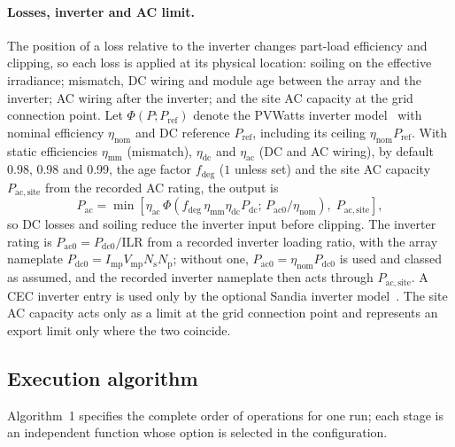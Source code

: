 \documentclass[11pt]{article}
\begin{document}
\paragraph{Losses, inverter and AC limit.}
The position of a loss relative to the inverter changes part-load efficiency and clipping, so each loss is applied at its physical location: soiling on the effective irradiance; mismatch, DC wiring and module age between the array and the inverter; AC wiring after the inverter; and the site AC capacity at the grid connection point. Let $\Phi(P;P_{\mathrm{ref}})$ denote the PVWatts inverter model~\cite{dobosPVWattsVersion52014} with nominal efficiency $\eta_{\mathrm{nom}}$ and DC reference $P_{\mathrm{ref}}$, including its ceiling $\eta_{\mathrm{nom}}P_{\mathrm{ref}}$. With static efficiencies $\eta_{\mathrm{mm}}$ (mismatch), $\eta_{\mathrm{dc}}$ and $\eta_{\mathrm{ac}}$ (DC and AC wiring), by default 0.98, 0.98 and 0.99, the age factor $f_{\mathrm{deg}}$ ($1$ unless set) and the site AC capacity $P_{\mathrm{ac,site}}$ from the recorded AC rating, the output is
\begin{equation}
P_{\mathrm{ac}}=\min\left[\eta_{\mathrm{ac}}\,\Phi\left(f_{\mathrm{deg}}\,\eta_{\mathrm{mm}}\eta_{\mathrm{dc}}P_{\mathrm{dc}};\,P_{\mathrm{ac0}}/\eta_{\mathrm{nom}}\right),\;P_{\mathrm{ac,site}}\right],
\label{eq:ac}
\end{equation}
so DC losses and soiling reduce the inverter input before clipping. The inverter rating is $P_{\mathrm{ac0}}=P_{\mathrm{dc0}}/\mathrm{ILR}$ from a recorded inverter loading ratio, with the array nameplate $P_{\mathrm{dc0}}=I_{\mathrm{mp}}V_{\mathrm{mp}}N_{\mathrm{s}}N_{\mathrm{p}}$; without one, $P_{\mathrm{ac0}}=\eta_{\mathrm{nom}}P_{\mathrm{dc0}}$ is used and classed as assumed, and the recorded inverter nameplate then acts through $P_{\mathrm{ac,site}}$. A CEC inverter entry is used only by the optional Sandia inverter model~\cite{king2007inverter}. The site AC capacity acts only as a limit at the grid connection point and represents an export limit only where the two coincide.

\subsection{Execution algorithm}
\label{sec:algo}

Algorithm~1 specifies the complete order of operations for one run; each stage is an independent function whose option is selected in the configuration.
\end{document}
